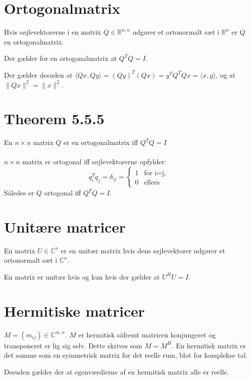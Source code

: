 \documentclass[a4paper,oneside,article]{memoir}
\newcommand{\inner}[2]{\langle #1,#2 \rangle}
\begin{document}
	\section{Ortogonalmatrix}
	Hvis søjlevektorerne i en matrix $Q\in \mathbb{R}^{n,n}$ udgører
	et ortonormalt sæt i $\mathbb{R}^n$ er $Q$ en ortogonalmatrix.
	
	Der gælder for en ortogonalmatrix at $Q^TQ=I$.
	
	Der gælder desuden at $\inner{Qx}{Qy}=(Qy)^T(Qx)=y^TQ^TQx=\inner{x}{y}$, 
	og at $\|Qx\|^2=\|x\|^2$.
	
	\section{Theorem 5.5.5}
	En $n\times n$ matrix $Q$ er en ortogonalmatrix iff $Q^TQ=I$
	\\
	\\
	$n\times n$ matrix er ortogonal iff søjlevektorerne opfylder:
	$$q_i^Tq_j=\delta_{ij}=\left\{ \begin{array}{ll}
			         1 & \mbox{for i=j},\\
			        0 & \mbox{ellers}\end{array} \right.$$
    Således er $Q$ ortogonal iff $Q^TQ=I$.
	
	\section{Unitære matricer}
	En matrix $U\in \mathbb{C}^n$ er en unitær matrix hvis dens søjlevektorer
	udgører et ortonormalt sæt i $\mathbb{C}^n$.
	
	En matrix er unitær hvis og kun hvis der gælder at $U^HU=I$.
	
	\section{Hermitiske matricer}
	$M=(m_{ij})\in \mathbb{C}^{m,n}$. $M$ er hermitisk såfremt matricen
	konjungeret og transponeret er lig sig selv. Dette skrives som $M=M^H$.
	En hermitisk matrix er det samme som en symmetrisk matrix for det
	reelle rum, blot for komplekse tal.
	
	Desuden gælder der at egenværdierne af en hermitisk matrix alle
	er reelle.
	
\end{document}
